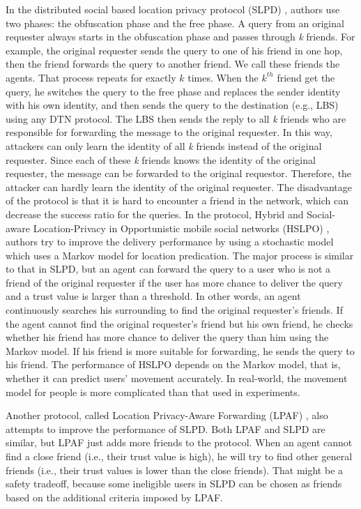 In the distributed social based location privacy protocol (SLPD) \cite{C16}, authors use two phases: the obfuscation phase and the free phase. A query from an original requester always starts in the obfuscation phase and passes through \textit{k} friends. For example, the original requester sends the query to one of his friend in one hop, then the friend forwards the query to another friend. We call these friends the agents. That process repeats for exactly $k$ times. When the $k^{th}$ friend get the query, he switches the query to the free phase and replaces the sender identity with his own identity, and then sends the query to the destination (e.g., LBS) using any DTN protocol. The LBS then sends the reply to all \textit{k} friends who are responsible for forwarding the message to the original requester. In this way, attackers can only learn the identity of all \textit{k} friends instead of the original requester. Since each of these \textit{k} friends knows the identity of the original requester, the message can be forwarded to the original requestor.  Therefore, the attacker can hardly learn the identity of the original requester. The disadvantage of the protocol is that it is hard to encounter a friend in the network, which can decrease the success ratio for the queries. 
In the protocol, Hybrid and Social-aware Location-Privacy in Opportunistic mobile social networks (HSLPO) \cite{C17}, authors try to improve the delivery performance by using a stochastic model which uses a Markov model for location predication. The major process is similar to that in SLPD, but an agent can forward the query to a user who is not a friend of the original requester if the user has more chance to deliver the query and a trust value is larger than a threshold. In other words, an agent continuously searches his surrounding to find the original requester's friends. If the agent cannot find the original requester's friend but his own friend, he checks whether his friend has more chance to deliver the query than him using the Markov model. If his friend is more suitable for forwarding, he sends the query to his friend. The performance of HSLPO depends on the Markov model, that is, whether it can predict users' movement accurately. In real-world, the movement model for people is more complicated than that used in experiments.

Another protocol, called Location Privacy-Aware Forwarding (LPAF) \cite{C18}, also attempts to improve the performance of SLPD. Both LPAF and SLPD are similar, but LPAF just adds more friends to the protocol. When an agent cannot find a close friend (i.e., their trust value is high), he will try to find other general friends (i.e., their trust values is lower than the close friends). That might be a safety tradeoff, because some ineligible users in SLPD can be chosen as friends based on the additional criteria imposed by LPAF.

